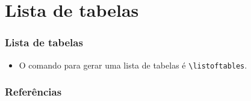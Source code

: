 \documentclass[brazilian]{beamer}
\begin{document}
\section{Lista de tabelas}
\begin{frame}[fragile]
  \frametitle{Lista de tabelas}

  \begin{itemize}
    \item O comando para gerar uma lista de tabelas é \lstinline[style=myStyleLatex]!\listoftables!.
  \end{itemize}

\end{frame}

\begin{frame}[allowframebreaks]
  \frametitle{Referências}
  \nocite{*}
  \printbibliography[keyword={inserirTabela}]
\end{frame}
\end{document}
